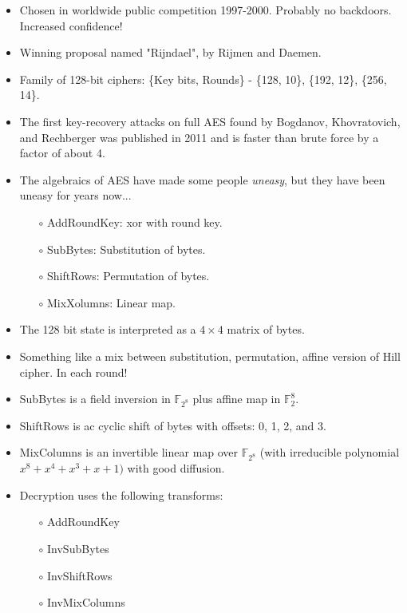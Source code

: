 \documentclass[a4paper]{scrartcl}
\begin{document}
\begin{itemize}
\item Chosen in worldwide public competition 1997-2000. Probably no backdoors. Increased confidence!
\item Winning proposal named "Rijndael", by Rijmen and Daemen.
\item Family of 128-bit ciphers: \{Key bits, Rounds\} - \{128, 10\}, \{192, 12\}, \{256, 14\}. 
\item The first key-recovery attacks on full AES found by Bogdanov, Khovratovich, and Rechberger was published in 2011 and is faster than brute force by a factor of about 4. 
\item The algebraics of AES have made some people \textit{uneasy}, but they have been uneasy for years now...
\begin{itemize}
\item [$\circ$] AddRoundKey: xor with round key.
\item [$\circ$] SubBytes: Substitution of bytes.
\item [$\circ$] ShiftRows: Permutation of bytes.
\item [$\circ$] MixXolumns: Linear map.
\end{itemize}
\end{itemize}

\begin{itemize}
\item The 128 bit state is interpreted as a $4 \times 4$ matrix of bytes.
\begin{center}

\end{center}
\item Something like a mix between substitution, permutation, affine version of Hill cipher. In each round!
\item SubBytes is a field inversion in $\mathbb{F}_{2^8}$ plus affine map in $\mathbb{F}_{2}^8$.
\item ShiftRows is ac cyclic shift of bytes with offsets: 0, 1, 2, and 3.
\item MixColumns is an invertible linear map over $\mathbb{F}_{2^8}$ (with irreducible polynomial $x^8 + x^4 +x^3 + x + 1)$ with good diffusion. 
\item Decryption uses the following transforms:
\begin{itemize}
\item [$\circ$] AddRoundKey
\item [$\circ$] InvSubBytes
\item [$\circ$] InvShiftRows
\item [$\circ$] InvMixColumns
\end{itemize}
\end{itemize}
\end{document}
